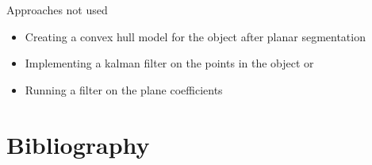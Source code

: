 \documentclass[10pt]{article}
\begin{document}
Approaches not used
\begin{itemize}
\item Creating a convex hull model for the object after planar segmentation
\item Implementing a kalman filter on the points in the object or
\item Running a filter on the plane coefficients
\end{itemize}

\section{Bibliography}
 

\end{document}
